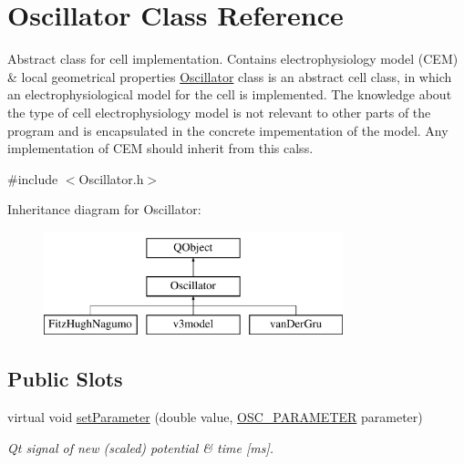 \hypertarget{class_oscillator}{\section{Oscillator Class Reference}
\label{class_oscillator}
}


Abstract class for cell implementation. Contains electrophysiology model (C\+E\+M) \& local geometrical properties \hyperlink{class_oscillator}{Oscillator} class is an abstract cell class, in which an electrophysiological model for the cell is implemented. The knowledge about the type of cell electrophysiology model is not relevant to other parts of the program and is encapsulated in the concrete impementation of the model. Any implementation of C\+E\+M should inherit from this calss.  




{\ttfamily \#include $<$Oscillator.\+h$>$}

Inheritance diagram for Oscillator\+:\begin{figure}[H]
\begin{center}
\leavevmode
\includegraphics[height=3.000000cm]{class_oscillator}
\end{center}
\end{figure}
\subsection*{Public Slots}
\begin{DoxyCompactItemize}
\item 
virtual void \hyperlink{class_oscillator_a56140e76f42036dc6d7a4cd989917edc}{set\+Parameter} (double value, \hyperlink{heart_defines_8h_a79395aba577c2bc57e7ca211ff3476a6}{O\+S\+C\+\_\+\+P\+A\+R\+A\+M\+E\+T\+E\+R} parameter)
\begin{DoxyCompactList}\small\item\em Qt signal of new (scaled) potential \& time \mbox{[}ms\mbox{]}. \end{DoxyCompactList}\end{DoxyCompactItemize}

